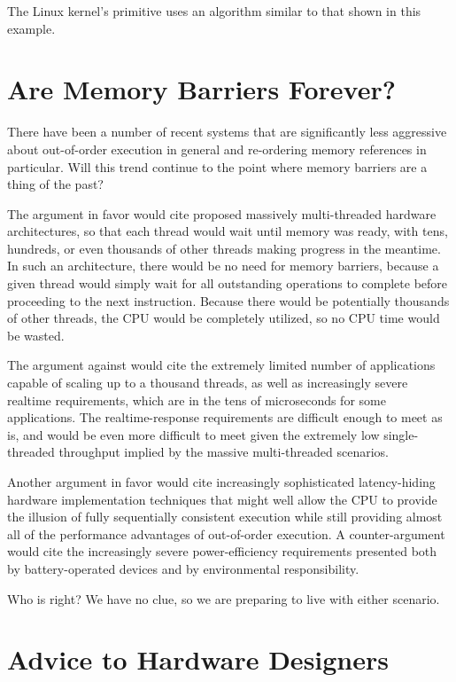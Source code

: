 The Linux kernel's  primitive uses an algorithm
similar to that shown in this example.

\section{Are Memory Barriers Forever?}
\label{sec:app:whymb:Are Memory Barriers Forever?}

There have been a number of recent systems that are significantly less
aggressive about out-of-order execution in general and re-ordering
memory references in particular.
Will this trend continue to the point where memory barriers are a thing
of the past?

The argument in favor would cite proposed massively multi-threaded hardware
architectures, so that each thread would wait until memory was ready,
with tens, hundreds, or even thousands of other threads making progress
in the meantime.
In such an architecture, there would be no need for memory barriers,
because a given thread would simply wait for all outstanding operations
to complete before proceeding to the next instruction.
Because there would be potentially thousands of other threads, the
CPU would be completely utilized, so no CPU time would be wasted.

The argument against would cite the extremely limited number of applications
capable of scaling up to a thousand threads, as well as increasingly
severe realtime requirements, which are in the tens of microseconds
for some applications.
The realtime-response requirements are difficult enough to meet as is,
and would be even more difficult to meet given the extremely low
single-threaded throughput implied by the massive multi-threaded
scenarios.

Another argument in favor would cite increasingly sophisticated
latency-hiding hardware implementation techniques that might well allow
the CPU to provide the illusion of fully sequentially consistent
execution while still providing almost all of the performance advantages
of out-of-order execution.
A counter-argument would cite the increasingly severe power-efficiency
requirements presented both by battery-operated devices and by
environmental responsibility.

Who is right?
We have no clue, so we are preparing to live with either scenario.

\section{Advice to Hardware Designers}
\label{sec:app:whymb:Advice to Hardware Designers}

